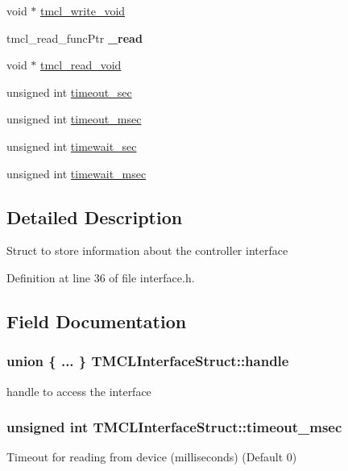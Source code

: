 \begin{DoxyCompactItemize}
\item 
void $\ast$ \hyperlink{structTMCLInterfaceStruct_acfb8740deb4a8a5ce6b7882866a93815}{tmcl\_\-write\_\-void}
\item 
\hypertarget{structTMCLInterfaceStruct_a766d5b0b2659e759696912d850026141}{
tmcl\_\-read\_\-funcPtr {\bfseries \_\-read}}
\label{structTMCLInterfaceStruct_a766d5b0b2659e759696912d850026141}

\item 
void $\ast$ \hyperlink{structTMCLInterfaceStruct_abaa02120f923776a8b238d45b6ca68b9}{tmcl\_\-read\_\-void}
\item 
unsigned int \hyperlink{structTMCLInterfaceStruct_a6fc25e45d20014501e64c14eb05faadf}{timeout\_\-sec}
\item 
unsigned int \hyperlink{structTMCLInterfaceStruct_af4cb989ea551afbad2d6150cb9bbe312}{timeout\_\-msec}
\item 
unsigned int \hyperlink{structTMCLInterfaceStruct_a145d56a20944085a1447ca7b58cbfbee}{timewait\_\-sec}
\item 
unsigned int \hyperlink{structTMCLInterfaceStruct_abb8e42924a82e082614dee2768229736}{timewait\_\-msec}
\end{DoxyCompactItemize}


\subsection{Detailed Description}
Struct to store information about the controller interface 

Definition at line 36 of file interface.h.

\subsection{Field Documentation}
\hypertarget{structTMCLInterfaceStruct_a32dd1aec6b11ffd4af19f56917a5809a}{
\subsubsection[{handle}]{\setlength{\rightskip}{0pt plus 5cm}union \{ ... \}   {\bf TMCLInterfaceStruct::handle}}}
\label{structTMCLInterfaceStruct_a32dd1aec6b11ffd4af19f56917a5809a}
handle to access the interface \hypertarget{structTMCLInterfaceStruct_af4cb989ea551afbad2d6150cb9bbe312}{
\subsubsection[{timeout\_\-msec}]{\setlength{\rightskip}{0pt plus 5cm}unsigned int {\bf TMCLInterfaceStruct::timeout\_\-msec}}}
\label{structTMCLInterfaceStruct_af4cb989ea551afbad2d6150cb9bbe312}
Timeout for reading from device (milliseconds) (Default 0) 

